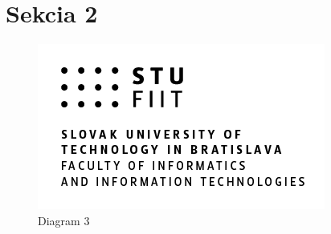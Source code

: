 \documentclass[10pt,english,a4paper]{article}
\begin{document}
 \lipsum[1-3]

 
 \section{Sekcia 2}
 \lipsum[1-4]
 \begin{figure}
 \centering
 \includegraphics[scale=0.5]{STU-FIIT-ancv.png}
 \centering
 \caption{Diagram 3}
 \end{figure}

 
 

\end{document}
